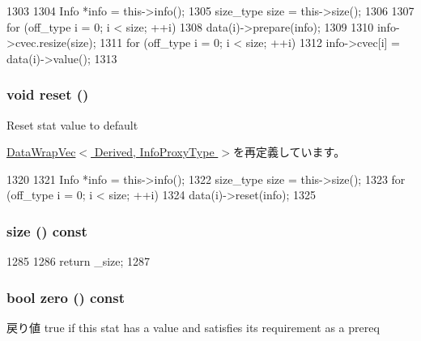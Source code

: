 \begin{DoxyCode}
1303     {
1304         Info *info = this->info();
1305         size_type size = this->size();
1306 
1307         for (off_type i = 0; i < size; ++i)
1308             data(i)->prepare(info);
1309 
1310         info->cvec.resize(size);
1311         for (off_type i = 0; i < size; ++i)
1312             info->cvec[i] = data(i)->value();
1313     }
\end{DoxyCode}
\hypertarget{classStats_1_1Vector2dBase_ad20897c5c8bd47f5d4005989bead0e55}{
\subsubsection[{reset}]{\setlength{\rightskip}{0pt plus 5cm}void reset ()}}
\label{classStats_1_1Vector2dBase_ad20897c5c8bd47f5d4005989bead0e55}
Reset stat value to default 

\hyperlink{classStats_1_1DataWrapVec_ad20897c5c8bd47f5d4005989bead0e55}{DataWrapVec$<$ Derived, InfoProxyType $>$}を再定義しています。


\begin{DoxyCode}
1320     {
1321         Info *info = this->info();
1322         size_type size = this->size();
1323         for (off_type i = 0; i < size; ++i)
1324             data(i)->reset(info);
1325     }
\end{DoxyCode}
\hypertarget{classStats_1_1Vector2dBase_a503ab01f6c0142145d3434f6924714e7}{
\subsubsection[{size}]{ size () const}}
\label{classStats_1_1Vector2dBase_a503ab01f6c0142145d3434f6924714e7}



\begin{DoxyCode}
1285     {
1286         return _size;
1287     }
\end{DoxyCode}
\hypertarget{classStats_1_1Vector2dBase_a4e72b01b727d3165e75cba84eb507491}{
\subsubsection[{zero}]{\setlength{\rightskip}{0pt plus 5cm}bool zero () const}}
\label{classStats_1_1Vector2dBase_a4e72b01b727d3165e75cba84eb507491}
\begin{DoxyReturn}{戻り値}
true if this stat has a value and satisfies its requirement as a prereq 
\end{DoxyReturn}


